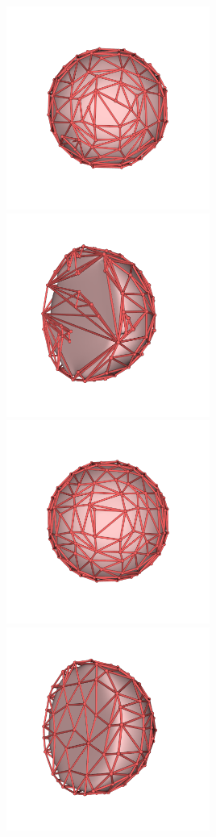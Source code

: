 \documentclass[varwidth,convert]{standalone}
\begin{document}
\includegraphics[width=0.5\textwidth]{images/half_sphere_clean_decimated_0.png}
\includegraphics[width=0.5\textwidth]{images/half_sphere_clean_decimated_1.png}
\includegraphics[width=0.5\textwidth]{images/half_sphere_noise_decimated_0.png}
\includegraphics[width=0.5\textwidth]{images/half_sphere_noise_decimated_1.png}
\end{document}
